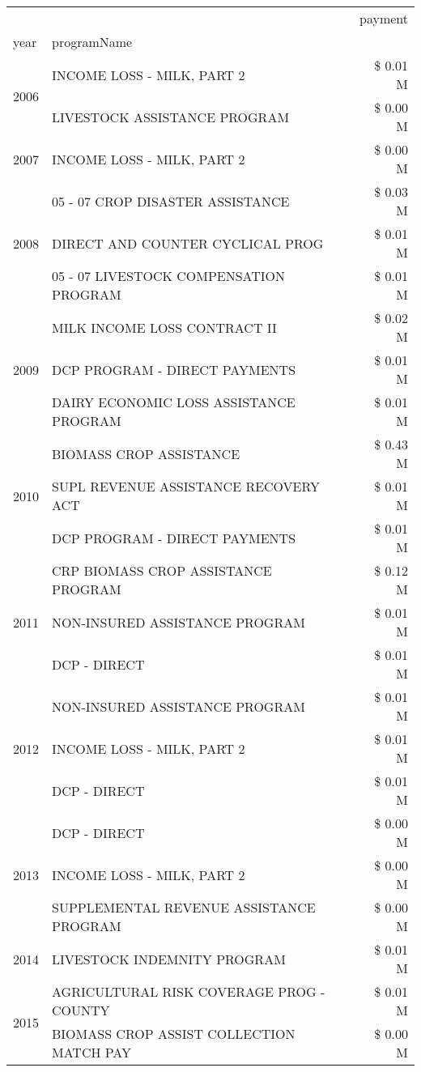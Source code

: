 \begin{tabular}{llr}
\toprule
 &  & payment \\
year & programName &  \\
\midrule
\multirow[t]{2}{*}{2006} & INCOME LOSS - MILK, PART 2 & \$ 0.01 M \\
 & LIVESTOCK ASSISTANCE PROGRAM & \$ 0.00 M \\
\cline{1-3}
2007 & INCOME LOSS - MILK, PART 2 & \$ 0.00 M \\
\cline{1-3}
\multirow[t]{3}{*}{2008} & 05 - 07 CROP DISASTER ASSISTANCE & \$ 0.03 M \\
 & DIRECT AND COUNTER CYCLICAL PROG & \$ 0.01 M \\
 & 05 - 07 LIVESTOCK COMPENSATION PROGRAM & \$ 0.01 M \\
\cline{1-3}
\multirow[t]{3}{*}{2009} & MILK INCOME LOSS CONTRACT II & \$ 0.02 M \\
 & DCP PROGRAM - DIRECT PAYMENTS & \$ 0.01 M \\
 & DAIRY ECONOMIC LOSS ASSISTANCE PROGRAM & \$ 0.01 M \\
\cline{1-3}
\multirow[t]{3}{*}{2010} & BIOMASS CROP ASSISTANCE & \$ 0.43 M \\
 & SUPL REVENUE ASSISTANCE RECOVERY ACT & \$ 0.01 M \\
 & DCP PROGRAM - DIRECT PAYMENTS & \$ 0.01 M \\
\cline{1-3}
\multirow[t]{3}{*}{2011} & CRP BIOMASS CROP ASSISTANCE PROGRAM & \$ 0.12 M \\
 & NON-INSURED ASSISTANCE PROGRAM & \$ 0.01 M \\
 & DCP - DIRECT & \$ 0.01 M \\
\cline{1-3}
\multirow[t]{3}{*}{2012} & NON-INSURED ASSISTANCE PROGRAM & \$ 0.01 M \\
 & INCOME LOSS - MILK, PART 2 & \$ 0.01 M \\
 & DCP - DIRECT & \$ 0.01 M \\
\cline{1-3}
\multirow[t]{3}{*}{2013} & DCP - DIRECT & \$ 0.00 M \\
 & INCOME LOSS - MILK, PART 2 & \$ 0.00 M \\
 & SUPPLEMENTAL REVENUE ASSISTANCE PROGRAM & \$ 0.00 M \\
\cline{1-3}
2014 & LIVESTOCK INDEMNITY PROGRAM & \$ 0.01 M \\
\cline{1-3}
\multirow[t]{3}{*}{2015} & AGRICULTURAL RISK COVERAGE PROG - COUNTY & \$ 0.01 M \\
 & BIOMASS CROP ASSIST COLLECTION MATCH PAY & \$ 0.00 M \\

\end{tabular}
